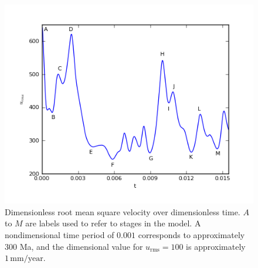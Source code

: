 \begin{figure}
  \centering
  \includegraphics[width=\largefig]{chapters/vynnytska/png/u_rms.png}
  \caption{Dimensionless root mean square velocity over
  dimensionless time. $A$ to $M$ are labels used to refer to stages
  in the model. A nondimensional time period of $0.001$ corresponds to
  approximately 300 Ma, and the dimensional value for $u_{\mathrm{rms}} = 100$ is
  approximately $1\,\mathrm{mm/year}$.}
  \label{vynnytska:fig:rms_velocity}
\end{figure}

